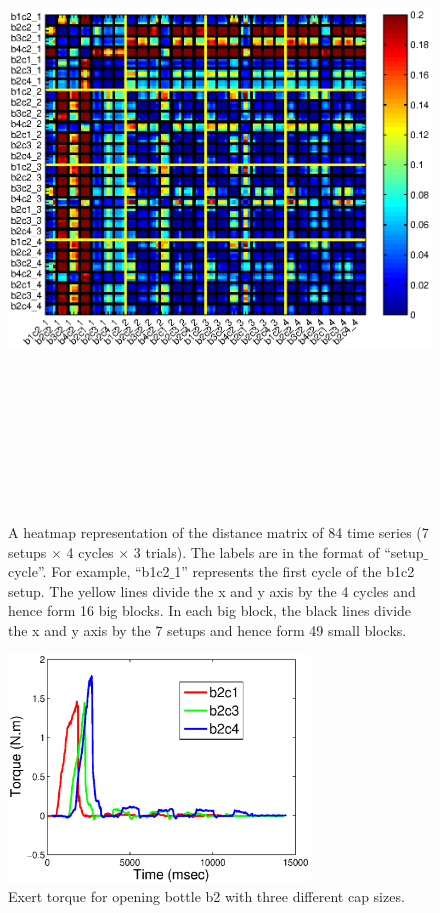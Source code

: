 \begin{figure}
\label{heatmap}
  \centering
  \includegraphics[width=18cm,height=18cm]{./fig/heatmap_all6.eps}
  \caption{ \scriptsize{A heatmap representation of the distance matrix of 84 time series (7 setups $\times$ 4 cycles $\times$ 3 trials). The labels are in the format of ``setup$\_$cycle''. For example, ``b1c2$\_$1'' represents the first cycle of the b1c2 setup. The yellow lines divide the x and y axis by the 4 cycles and hence form 16 big blocks. In each big block, the black lines divide the x and y axis by the 7 setups and hence form 49 small blocks. }
}
\label{fig:heatmap}
\end{figure}

\begin{figure}
    \centering
    \includegraphics[width=8cm]{./fig/c1c3c4_time_T.eps}
    \caption{ \scriptsize{Exert torque for opening bottle b2 with three different cap sizes.}
}
\label{fig:cappatterns}
\end{figure}


